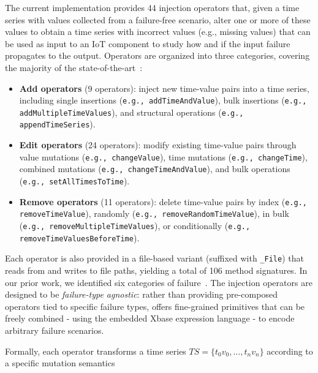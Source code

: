 The current implementation provides 44 injection operators that, given a time series with values collected from a failure-free scenario, alter one or more of these values to obtain a time series with incorrect values (e.g., missing values) that can be used as input to an IoT component to study how and if the input failure propagates to the output.  
Operators are organized into three categories, covering the majority of the state-of-the-art~\citep{gomez-abajo_wodel-test_2021,cotroneo_profipy_2020}:
\begin{itemize}
    \item \textbf{Add operators} (9 operators): inject new time-value pairs into a time series, including single insertions (\texttt{e.g., addTimeAndValue}), bulk insertions (\texttt{e.g., addMultipleTimeValues}), and structural operations (\texttt{e.g., appendTimeSeries}).
    \item \textbf{Edit operators} (24 operators): modify existing time-value pairs through value mutations (\texttt{e.g., changeValue}), time mutations (\texttt{e.g., changeTime}), combined mutations (\texttt{e.g., changeTimeAndValue}), and bulk operations (\texttt{e.g., setAllTimesToTime}).
    \item \textbf{Remove operators} (11 operators): delete time-value pairs by index (\texttt{e.g., removeTimeValue}), randomly (\texttt{e.g., removeRandomTimeValue}), in bulk (\texttt{e.g., removeMultipleTimeValues}), or conditionally (\texttt{e.g., removeTimeValuesBeforeTime}).
\end{itemize}
Each operator is also provided in a file-based variant (suffixed with \texttt{\_File}) that reads from and writes to file paths, yielding a total of 106 method signatures. In our prior work, we identified six categories of failure~\citep{10350526}. The injection operators are designed to be \textit{failure-type agnostic}: rather than providing pre-composed operators tied to specific failure types, \tool offers fine-grained primitives that can be freely combined - using the embedded Xbase expression language - to encode arbitrary failure scenarios. %

Formally, each operator transforms a time series $TS = \{t_0 v_0, \ldots, t_n v_n\}$ according to a specific mutation semantics%

